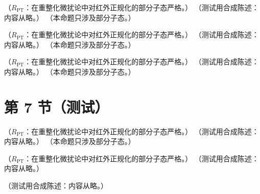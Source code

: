 \begin{theorem}\label{thm:qcd-renormalizability}
（$R_{\mathrm{PT}}$：在重整化微扰论中对红外正规化的部分子态严格。）
（测试用合成陈述：内容从略。）
（本命题只涉及部分子态。）
\end{theorem}

\begin{proposition}\label{prop:qcd-st-relations}
（$R_{\mathrm{PT}}$：在重整化微扰论中对红外正规化的部分子态严格。）
（测试用合成陈述：内容从略。）
（本命题只涉及部分子态。）
\end{proposition}

\begin{theorem}\label{thm:prelim-slavnov-taylor}
（$R_{\mathrm{PT}}$：在重整化微扰论中对红外正规化的部分子态严格。）
（测试用合成陈述：内容从略。）
（本命题只涉及部分子态。）
\end{theorem}

\section{第 7 节（测试）}\label{sec:prelim-renorm}

\begin{proposition}\label{prop:qcd-xi-independence}
（$R_{\mathrm{PT}}$：在重整化微扰论中对红外正规化的部分子态严格。）
（测试用合成陈述：内容从略。）
（本命题只涉及部分子态。）
\end{proposition}

\begin{theorem}\label{thm:prelim-composite-renorm}
（$R_{\mathrm{PT}}$：在重整化微扰论中对红外正规化的部分子态严格。）
（测试用合成陈述：内容从略。）
\end{theorem}

\begin{remark}\label{rem:qcd-bphz-brst}
（测试用合成陈述：内容从略。）
\end{remark}

